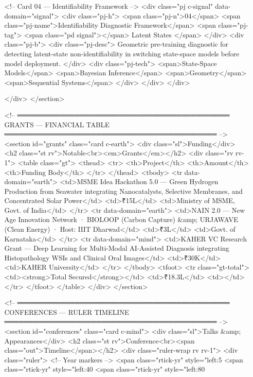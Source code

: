     <!-- Card 04 — Identifiability Framework -->
    <div class="pj c-signal" data-domain="signal">
      <div class="pj-h">
        <span class="pj-n">04</span>
        <span class="pj-name">Identifiability Diagnostic Framework</span>
        <span class="pj-tag">
          <span class="pd signal"></span>
          Latent States
        </span>
      </div>
      <div class="pj-b">
        <div class="pj-desc">
          Geometric pre-training diagnostic for detecting latent-state non-identifiability in switching state-space models before model deployment.
        </div>
        <div class="pj-tech">
          <span>State-Space Models</span>
          <span>Bayesian Inference</span>
          <span>Geometry</span>
          <span>Sequential Systems</span>
        </div>
      </div>
    </div>

  </div>
</section>

<!-- ════════════════════════════════════════════
     GRANTS — FINANCIAL TABLE
════════════════════════════════════════════ -->
<section id="grants" class="card c-earth">
  <div class="sl">Funding</div>
  <h2 class="st rv">Notable<br><em>Grants</em></h2>
  <div class="rv rv-1">
    <table class="gt">
      <thead>
        <tr>
          <th>Project</th>
          <th>Amount</th>
          <th>Funding Body</th>
        </tr>
      </thead>
      <tbody>
        <tr data-domain="earth">
          <td>MSME Idea Hackathon 5.0 — Green Hydrogen Production from Seawater integrating Nanocatalysts, Selective Membranes, and Concentrated Solar Power</td>
          <td>₹15L</td>
          <td>Ministry of MSME, Govt. of India</td>
        </tr>
        <tr data-domain="earth">
          <td>NAIN 2.0 — New Age Innovation Network · BIOLOOP (Carbon Capture) &amp; URJAWAVE (Clean Energy) · Host: IIIT Dharwad</td>
          <td>₹3L</td>
          <td>Govt. of Karnataka</td>
        </tr>
        <tr data-domain="mind">
          <td>KAHER VC Research Grant — Deep Learning for Multi-Modal AI-Assisted Diagnosis integrating Histopathology WSIs and Clinical Oral Images</td>
          <td>₹30K</td>
          <td>KAHER University</td>
        </tr>
      </tbody>
      <tfoot>
        <tr class="gt-total">
          <td><strong>Total Secured</strong></td>
          <td>₹18.3L</td>
          <td></td>
        </tr>
      </tfoot>
    </table>
  </div>
</section>

<!-- ════════════════════════════════════════════
     CONFERENCES — RULER TIMELINE
════════════════════════════════════════════ -->
<section id="conferences" class="card c-mind">
  <div class="sl">Talks &amp; Appearances</div>
  <h2 class="st rv">Conference<br><span class="out">Timeline</span></h2>
  <div class="ruler-wrap rv rv-1">
    <div class="ruler">
      <!-- Year markers -->
      <span class="rtick-yr" style="left:5%
      <span class="rtick-yr" style="left:40%
      <span class="rtick-yr" style="left:80%

